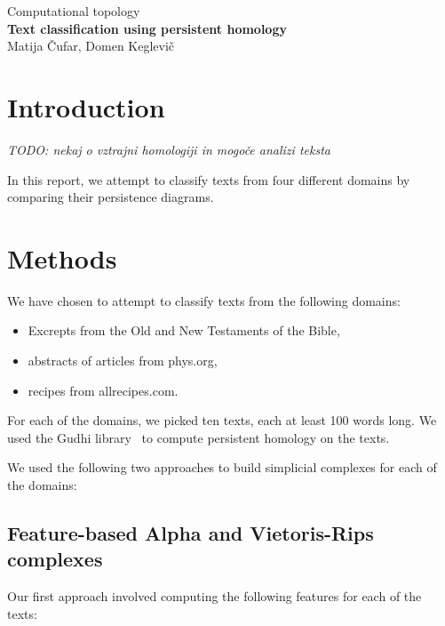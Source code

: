 \documentclass[12pt,a4paper]{amsart}
\begin{document}
\thispagestyle{empty}
\begin{center}{\large
Computational topology\\[4mm]
{\bf Text classification using persistent homology}\\[4mm]
Matija Čufar, Domen Keglevič\\[6mm]
}
\end{center}
\bigskip

\section{Introduction}

\emph{TODO: nekaj o vztrajni homologiji in mogoče analizi teksta}

In this report, we attempt to classify texts from four different domains by
comparing their persistence diagrams.

\section{Methods}

We have chosen to attempt to classify texts from the following domains:

\begin{itemize}
\item Excrepts from the Old and New Testaments of the Bible,
\item abstracts of articles from phys.org,
\item recipes from allrecipes.com.
\end{itemize}

For each of the domains, we picked ten texts, each at least 100 words long. We
used the Gudhi library~\cite{maria2014gudhi} to compute persistent homology on
the texts.

We used the following two approaches to build simplicial complexes for each of
the domains:

\subsection{Feature-based Alpha and Vietoris-Rips complexes}

Our first approach involved computing the following features for each of the
texts:
\end{document}
